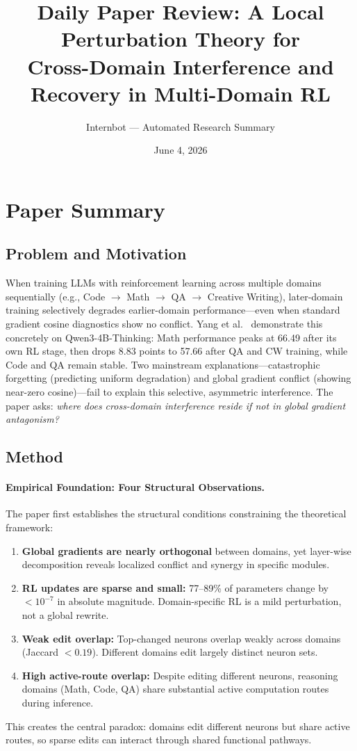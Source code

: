\documentclass[11pt,a4paper]{article}
\title{Daily Paper Review: A Local Perturbation Theory for\\Cross-Domain Interference and Recovery in Multi-Domain RL}
\author{Internbot --- Automated Research Summary}
\date{June 4, 2026}
\begin{document}
\maketitle

\section{Paper Summary}

\subsection{Problem and Motivation}

When training LLMs with reinforcement learning across multiple domains sequentially (e.g., Code $\to$ Math $\to$ QA $\to$ Creative Writing), later-domain training selectively degrades earlier-domain performance---even when standard gradient cosine diagnostics show no conflict. Yang et al.~\cite{yang2026perturbation} demonstrate this concretely on Qwen3-4B-Thinking: Math performance peaks at 66.49 after its own RL stage, then drops 8.83 points to 57.66 after QA and CW training, while Code and QA remain stable. Two mainstream explanations---catastrophic forgetting (predicting uniform degradation) and global gradient conflict (showing near-zero cosine)---fail to explain this selective, asymmetric interference. The paper asks: \emph{where does cross-domain interference reside if not in global gradient antagonism?}

\subsection{Method}

\paragraph{Empirical Foundation: Four Structural Observations.}
The paper first establishes the structural conditions constraining the theoretical framework:
\begin{enumerate}
\item \textbf{Global gradients are nearly orthogonal} between domains, yet layer-wise decomposition reveals localized conflict and synergy in specific modules.
\item \textbf{RL updates are sparse and small:} 77--89\% of parameters change by $<10^{-7}$ in absolute magnitude. Domain-specific RL is a mild perturbation, not a global rewrite.
\item \textbf{Weak edit overlap:} Top-changed neurons overlap weakly across domains (Jaccard $<0.19$). Different domains edit largely distinct neuron sets.
\item \textbf{High active-route overlap:} Despite editing different neurons, reasoning domains (Math, Code, QA) share substantial active computation routes during inference.
\end{enumerate}
This creates the central paradox: domains edit different neurons but share active routes, so sparse edits can interact through shared functional pathways.
\end{document}
